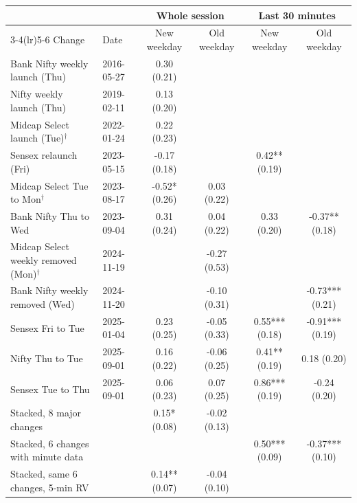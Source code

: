 \begin{tabular}{llcccc}
\toprule
 & & \multicolumn{2}{c}{Whole session} & \multicolumn{2}{c}{Last 30 minutes} \\
\cmidrule(lr){3-4}\cmidrule(lr){5-6}
Change & Date & New weekday & Old weekday & New weekday & Old weekday \\
\midrule
Bank Nifty weekly launch (Thu) & 2016-05-27 & 0.30 (0.21) &  &  &  \\
Nifty weekly launch (Thu) & 2019-02-11 & 0.13 (0.20) &  &  &  \\
Midcap Select launch (Tue)$^\dagger$ & 2022-01-24 & 0.22 (0.23) &  &  &  \\
Sensex relaunch (Fri) & 2023-05-15 & -0.17 (0.18) &  & 0.42** (0.19) &  \\
Midcap Select Tue to Mon$^\dagger$ & 2023-08-17 & -0.52* (0.26) & 0.03 (0.22) &  &  \\
Bank Nifty Thu to Wed & 2023-09-04 & 0.31 (0.24) & 0.04 (0.22) & 0.33 (0.20) & -0.37** (0.18) \\
Midcap Select weekly removed (Mon)$^\dagger$ & 2024-11-19 &  & -0.27 (0.53) &  &  \\
Bank Nifty weekly removed (Wed) & 2024-11-20 &  & -0.10 (0.31) &  & -0.73*** (0.21) \\
Sensex Fri to Tue & 2025-01-04 & 0.23 (0.25) & -0.05 (0.33) & 0.55*** (0.18) & -0.91*** (0.19) \\
Nifty Thu to Tue & 2025-09-01 & 0.16 (0.22) & -0.06 (0.25) & 0.41** (0.19) & 0.18 (0.20) \\
Sensex Tue to Thu & 2025-09-01 & 0.06 (0.23) & 0.07 (0.25) & 0.86*** (0.19) & -0.24 (0.20) \\
\midrule
Stacked, 8 major changes & & 0.15* (0.08) & -0.02 (0.13) & & \\
Stacked, 6 changes with minute data & & & & 0.50*** (0.09) & -0.37*** (0.10) \\
Stacked, same 6 changes, 5-min RV & & 0.14** (0.07) & -0.04 (0.10) & & \\
\bottomrule
\end{tabular}